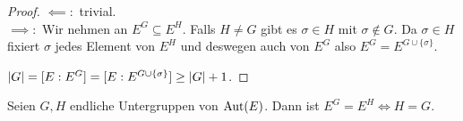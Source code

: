 \begin{proof}
	$\impliedby:$ trivial.\\
	$\implies:$ Wir nehmen an $E^{G} \subseteq E^{H}$. Falls $H \neq G$ gibt es $\sigma \in H$ mit $\sigma \not\in G$.
	Da $\sigma \in H$ fixiert $\sigma$ jedes Element von $E^{H}$ und deswegen auch von $E^{G}$ also $ E^{G} = E^{G \cup \{\sigma\} }$.

	$\abs{G} = [E : E^{G}] = [E: E^{G \cup \{\sigma\}}] \geq \abs{G} + 1$. \contra
\end{proof}

\begin{corollary}
	Seien $G,H$ endliche Untergruppen von $\operatorname{Aut}(E)$. Dann ist $E^{G} = E^{H} \Leftrightarrow H = G$.
\end{corollary}



























